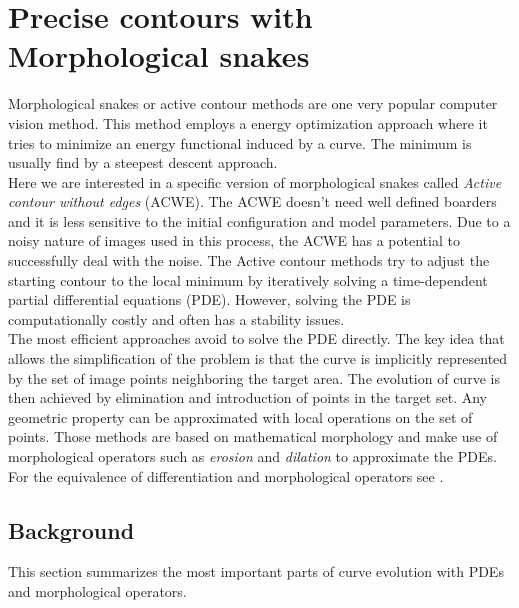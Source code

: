 
\section{Precise contours with Morphological snakes}

Morphological snakes or active contour methods are one very popular computer vision method. This method employs a energy optimization approach where it tries to minimize an energy functional induced by a curve.  The minimum is usually find by a steepest descent approach. \\

Here we are interested in a specific version of morphological snakes called \textit{Active contour without edges} (ACWE). The ACWE doesn't need well defined boarders and it is less sensitive to the initial configuration and model parameters. Due to a noisy nature of images used in this process, the ACWE has a potential to successfully deal with the noise. The Active contour methods try to adjust the starting contour to the local minimum by iteratively solving a time-dependent partial differential equations (PDE). However, solving the PDE is computationally costly and often has a stability issues. \\

The most efficient approaches avoid to solve the PDE directly. The key idea that allows the simplification of the problem is that the curve is implicitly  represented by the set of image points neighboring the target area. The evolution of curve is then achieved by elimination and introduction of points in the target set. Any geometric property can be approximated with local operations on the set of points. Those methods are based on mathematical morphology and make use of morphological operators such as \textit{erosion} and \textit{dilation} to approximate the PDEs. For the equivalence of differentiation and morphological operators see \cite{Pami2013}.




\subsection{Background }

This section summarizes the most important parts of curve evolution with PDEs and morphological operators.




